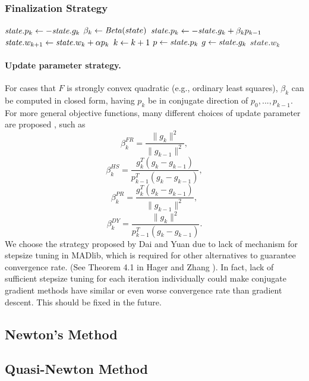 \subsubsection{Finalization Strategy}
\begin{algorithm} \label{alg:finalization-cg}
\begin{algorithmic}[1]
        \State $\mathit{state}.p_k \leftarrow - \mathit{state}.g_k$
    \Else
        \State $\beta_k \leftarrow \mathit{Beta}(state)$
        \State $\mathit{state}.p_k \leftarrow - \mathit{state}.g_k + \beta_k p_{k-1}$
    \EndIf
    \State $\mathit{state}.w_{k+1} \leftarrow \mathit{state}.w_k + \alpha p_k$
    \State $k \leftarrow k + 1$
    \State $p \leftarrow \mathit{state}.p_k$
    \State $g \leftarrow \mathit{state}.g_k$
    \State \Return $\mathit{state}.w_k$
\end{algorithmic}
\end{algorithm}

\paragraph{Update parameter strategy.}
For cases that $F$ is strongly convex quadratic (e.g., ordinary least squares), $\beta_k$ can be computed in closed form, having $p_k$ be in conjugate direction of $p_0,...,p_{k-1}$.
For more general objective functions, many different choices of update parameter are proposed \cite{hager2006survey, nocedal2006numerical}, such as
\[\beta_k^{FR} = \frac{\|g_k\|^2}{\|g_{k-1}\|^2},\]
\[\beta_k^{HS} = \frac{g_k^T (g_k - g_{k-1})}{p_{k-1}^T (g_k - g_{k-1})},\]
\[\beta_k^{PR} = \frac{g_k^T (g_k - g_{k-1})}{\|g_{k-1}\|^2},\]
\[\beta_k^{DY} = \frac{\|g_k\|^2}{p_{k-1}^T (g_k - g_{k-1})}.\]
We choose the strategy proposed by Dai and Yuan due to lack of mechanism for stepsize tuning in MADlib, which is required for other alternatives to guarantee convergence rate. (See Theorem 4.1 in Hager and Zhang \cite{hager2006survey}).
In fact, lack of sufficient stepsize tuning for each iteration individually could make conjugate gradient methods have similar or even worse convergence rate than gradient descent.
This should be fixed in the future.

\subsection{Newton's Method}
\subsection{Quasi-Newton Method}

